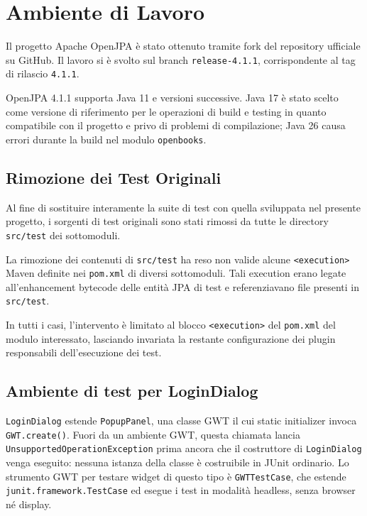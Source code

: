 \section{Ambiente di Lavoro}
\label{sec:ambiente}

Il progetto Apache OpenJPA è stato ottenuto tramite fork del repository
ufficiale su GitHub.
Il lavoro si è svolto sul branch \texttt{release-4.1.1}, corrispondente
al tag di rilascio \texttt{4.1.1}.

OpenJPA 4.1.1 supporta Java 11 e versioni successive.
Java 17 è stato scelto come versione di riferimento per le operazioni di
build e testing in quanto compatibile con il progetto e privo di problemi
di compilazione; Java 26 causa errori durante la build nel modulo
\texttt{openbooks}.

\subsection{Rimozione dei Test Originali}

Al fine di sostituire interamente la suite di test con quella sviluppata
nel presente progetto, i sorgenti di test originali sono stati rimossi
da tutte le directory \texttt{src/test} dei sottomoduli.

La rimozione dei contenuti di \texttt{src/test} ha reso non valide alcune
\texttt{<execution>} Maven definite nei \texttt{pom.xml} di diversi
sottomoduli.
Tali execution erano legate all'enhancement bytecode delle entità JPA di
test e referenziavano file presenti in \texttt{src/test}.

In tutti i casi, l'intervento è limitato al blocco \texttt{<execution>}
del \texttt{pom.xml} del modulo interessato, lasciando invariata la
restante configurazione dei plugin responsabili dell'esecuzione
dei test.

\subsection{Ambiente di test per LoginDialog}
\label{sec:ambiente-logindialog}

\texttt{LoginDialog} estende \texttt{PopupPanel}, una classe GWT il cui
static initializer invoca \texttt{GWT.create()}. Fuori da un ambiente
GWT, questa chiamata lancia
\texttt{UnsupportedOperationException} prima ancora che il costruttore
di \texttt{LoginDialog} venga eseguito: nessuna istanza della classe è
costruibile in JUnit ordinario. Lo strumento
GWT per testare widget di questo tipo è \texttt{GWTTestCase}, che estende
\texttt{junit.framework.TestCase} ed esegue i test in modalità headless,
senza browser né display.

